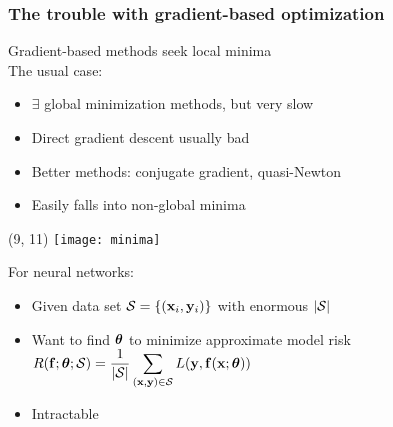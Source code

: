 \begin{frame}[t]
    \frametitle{The trouble with gradient-based optimization}

    Gradient-based methods \citep{PressNR} seek local minima \\[1ex]

    The usual case:
    \begin{itemize}
        \item $\exists$ global minimization methods, but very slow
        \item Direct gradient descent usually bad
        \item Better methods: conjugate gradient, quasi-Newton
        \item \alert{Easily falls into non-global minima}
    \end{itemize}

    \begin{textblock}{6}(9, 11)
        \texttt{[image: minima]}
    \end{textblock}

    \pause

    For neural networks:
    \begin{itemize}
        \item Given data set $\S = \{(\x_i, \y_i)\}$ with enormous $|\S|$
        \item Want to find $\THETA$ to minimize approximate model risk $\displaystyle R(\f; \THETA; \S) = \frac{1}{|\S|} \sum_{(\x, \y) \in \S} L(\y, \f(\x; \THETA))$
        \item \alert{Intractable}
    \end{itemize}
\end{frame}

